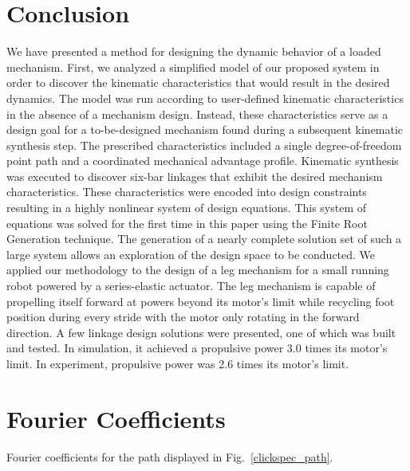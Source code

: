 \documentclass[journal]{IEEEtran}
\begin{document}
\section{Conclusion}
\label{sec:conclusion}

We have presented a method for designing the dynamic behavior of a loaded mechanism.
First, we analyzed a simplified model of our proposed system in order to discover the kinematic characteristics that would result in the desired dynamics.
The model was run according to user-defined kinematic characteristics in the absence of a mechanism design.
Instead, these characteristics serve as a design goal for a to\nobreakdash-be\nobreakdash-designed mechanism found during a subsequent kinematic synthesis step.
The prescribed characteristics included a single degree\nobreakdash-of\nobreakdash-freedom point path and a coordinated mechanical advantage profile.
Kinematic synthesis was executed to discover six-bar linkages that exhibit the desired mechanism characteristics.
These characteristics were encoded into design constraints resulting in a highly nonlinear system of design equations.
This system of equations was solved for the first time in this paper using the Finite Root Generation technique.
The generation of a nearly complete solution set of such a large system allows an exploration of the design space to be conducted.
We applied our methodology to the design of a leg mechanism for a small running robot powered by a series-elastic actuator.
The leg mechanism is capable of propelling itself forward at powers beyond its motor's limit while recycling foot position during every stride with the motor only rotating in the forward direction.
A few linkage design solutions were presented, one of which was built and tested.
In simulation, it achieved a propulsive power 3.0 times its motor's limit.  In experiment, propulsive power was 2.6 times its motor's limit.



\appendices
\section{Fourier Coefficients}
\label{app:fourier_coefficients}

\vspace{2mm}

Fourier coefficients for the path displayed in Fig.~\ref{clickspec_path}.

\vspace{2mm}
\end{document}
